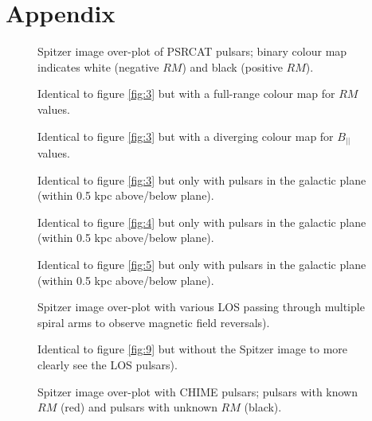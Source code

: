 \documentclass[12pt]{article}
\begin{document}
\section{Appendix}
    \begin{figure}[!htb]
        \caption{\label{fig:3} Spitzer image over-plot of PSRCAT pulsars; binary colour map indicates white (negative $RM$) and black (positive $RM$).}
    \end{figure}
    \begin{figure}[!htb]
        \caption{\label{fig:4} Identical to figure \eqref{fig:3} but with a full-range colour map for $RM$ values.}
    \end{figure}
    \begin{figure}[!htb]
        \caption{\label{fig:5} Identical to figure \eqref{fig:3} but with a diverging colour map for $B_{||}$ values.}
    \end{figure}
    \begin{figure}[!htb]
        \caption{\label{fig:6} Identical to figure \eqref{fig:3} but only with pulsars in the galactic plane (within 0.5 kpc above/below plane).}
    \end{figure}
    \begin{figure}[!htb]
        \caption{\label{fig:7} Identical to figure \eqref{fig:4} but only with pulsars in the galactic plane (within 0.5 kpc above/below plane).}
    \end{figure}
    \begin{figure}[!htb]
        \caption{\label{fig:8} Identical to figure \eqref{fig:5} but only with pulsars in the galactic plane (within 0.5 kpc above/below plane).}
    \end{figure}
    \begin{figure}[!htb]
        \caption{\label{fig:9} Spitzer image over-plot with various LOS passing through multiple spiral arms to observe magnetic field reversals).}
    \end{figure}
    \begin{figure}[!htb]
        \caption{\label{fig:10} Identical to figure \eqref{fig:9} but without the Spitzer image to more clearly see the LOS pulsars).}
    \end{figure}
    \begin{figure}[!htb]
        \caption{\label{fig:11} Spitzer image over-plot with CHIME pulsars; pulsars with known $RM$ (red) and pulsars with unknown $RM$ (black).}
    \end{figure}
    
\end{document}
